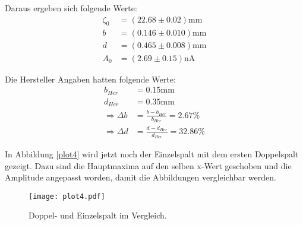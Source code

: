 Daraus ergeben sich folgende Werte:
\begin{align*}
  \zeta_0 &= (22.68 \pm 0.02) \text{mm} \\
  b &= (0.146 \pm 0.010) \text{mm} \\
  d &= (0.465 \pm 0.008) \text{mm} \\
  A_0 &= (2.69 \pm 0.15) \text{nA}
\end{align*}

Die Hersteller Angaben hatten folgende Werte:
\begin{align*}
  b_{Her} &= 0.15 \text{mm} \\
  d_{Her} &= 0.35 \text{mm} \\
  \Rightarrow \Delta b &= \frac{b - b_{Her}}{b_{Her}} = 2.67\% \\
  \Rightarrow \Delta d &= \frac{d - d_{Her}}{d_{Her}} = 32.86\%
\end{align*}

In Abbildung \ref{plot4} wird jetzt noch der Einzelspalt mit dem ersten Doppelspalt gezeigt.
Dazu sind die Hauptmaxima auf den selben x-Wert geschoben und die Amplitude angepasst worden, damit die Abbildungen vergleichbar werden.

\begin{figure}
  \centering
  \texttt{[image: plot4.pdf]}
  \caption{Doppel- und Einzelspalt im Vergleich.}
  \label{fig:plot4}
\end{figure}
\FloatBarrier